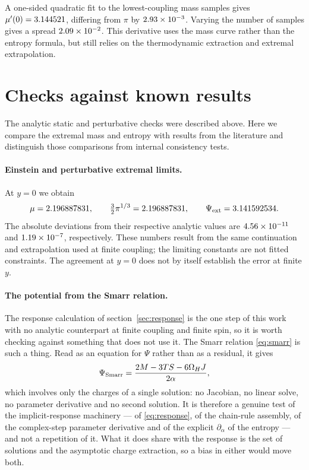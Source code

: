 \documentclass[11pt,a4paper]{article}
\begin{document}
A one-sided quadratic fit to the lowest-coupling mass samples gives
$\mu'(0)=3.144521$, differing from $\pi$ by $2.93\times 10^{-3}$.
Varying the number of samples gives a spread $2.09\times 10^{-2}$.
This derivative uses the mass curve rather than the entropy formula,
but still relies on the thermodynamic extraction and extremal extrapolation.

\section{Checks against known results}
\label{sec:checks}

The analytic static and perturbative checks were described above.
Here we compare the extremal mass and entropy with results from the literature
and distinguish those comparisons from internal consistency tests.

\paragraph{Einstein and perturbative extremal limits.}
At $y=0$ we obtain
\begin{equation*}
 \mu=2.196887831,\qquad \tfrac32\pi^{1/3}=2.196887831,\qquad
 \Psi_{\mathrm{ext}}=3.141592534 .
\end{equation*}
The absolute deviations from their respective analytic values are
$4.56\times 10^{-11}$ and $1.19\times 10^{-7}$, respectively.
These numbers result from the same continuation and extrapolation
used at finite coupling; the limiting constants are not fitted constraints.
The agreement at $y=0$ does not by itself establish the error at finite $y$.

\paragraph{The potential from the Smarr relation.}
The response calculation of section~\ref{sec:response} is the one step of this
work with no analytic counterpart at finite coupling and finite spin, so it is
worth checking against something that does not use it. The Smarr relation
\eqref{eq:smarr} is such a thing. Read as an equation for $\Psi$ rather than as
a residual, it gives
\begin{equation}
 \Psi_{\rm Smarr}=\frac{2M-3TS-6\Omega_HJ}{2\alpha},
 \label{eq:psismarr}
\end{equation}
which involves only the charges of a single solution: no Jacobian, no linear
solve, no parameter derivative and no second solution. It is therefore a
genuine test of the implicit-response machinery --- of \eqref{eq:response}, of
the chain-rule assembly, of the complex-step parameter derivative and of the
explicit $\partial_\alpha$ of the entropy --- and not a repetition of it. What
it does share with the response is the set of solutions and the asymptotic
charge extraction, so a bias in either would move both.
\end{document}

